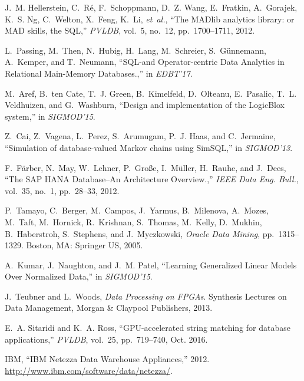 \documentclass[11pt,dvipdfm]{article}
\begin{document}
\begin{thebibliography}{10}
\itemsep=1pt 
\begin{small}

J.~M. Hellerstein, C.~R{\'e}, F.~Schoppmann, D.~Z. Wang, E.~Fratkin,
  A.~Gorajek, K.~S. Ng, C.~Welton, X.~Feng, K.~Li, {\em et~al.}, ``{The MADlib
  analytics library: or MAD skills, the SQL},'' {\em PVLDB}, vol.~5, no.~12,
  pp.~1700--1711, 2012.

L.~Passing, M.~Then, N.~Hubig, H.~Lang, M.~Schreier, S.~G{\"u}nnemann,
  A.~Kemper, and T.~Neumann, ``{SQL-and Operator-centric Data Analytics in
  Relational Main-Memory Databases.},'' in {\em EDBT'17}.

M.~Aref, B.~ten Cate, T.~J. Green, B.~Kimelfeld, D.~Olteanu, E.~Pasalic, T.~L.
  Veldhuizen, and G.~Washburn, ``{Design and implementation of the LogicBlox
  system},'' in {\em SIGMOD'15}.

Z.~Cai, Z.~Vagena, L.~Perez, S.~Arumugam, P.~J. Haas, and C.~Jermaine,
  ``{Simulation of database-valued Markov chains using SimSQL},'' in {\em
  SIGMOD'13}.

F.~F{\"a}rber, N.~May, W.~Lehner, P.~Gro{\ss}e, I.~M{\"u}ller, H.~Rauhe, and
  J.~Dees, ``{The SAP HANA Database--An Architecture Overview.},'' {\em IEEE
  Data Eng. Bull.}, vol.~35, no.~1, pp.~28--33, 2012.

P.~Tamayo, C.~Berger, M.~Campos, J.~Yarmus, B.~Milenova, A.~Mozes, M.~Taft,
  M.~Hornick, R.~Krishnan, S.~Thomas, M.~Kelly, D.~Mukhin, B.~Haberstroh,
  S.~Stephens, and J.~Myczkowski, {\em {Oracle Data Mining}}, pp.~1315--1329.
\newblock Boston, MA: Springer US, 2005.

A.~Kumar, J.~Naughton, and J.~M. Patel, ``{Learning Generalized Linear Models
  Over Normalized Data},'' in {\em SIGMOD'15}.

J.~Teubner and L.~Woods, {\em {Data Processing on FPGAs}}.
\newblock Synthesis Lectures on Data Management, Morgan {\&} Claypool
  Publishers, 2013.

E.~A. Sitaridi and K.~A. Ross, ``{{GPU}-accelerated string matching for
  database applications},'' {\em PVLDB}, vol.~25, pp.~719--740, Oct. 2016.

IBM, ``{{IBM Netezza} Data Warehouse Appliances},'' 2012.
\newblock \url{http://www.ibm.com/software/data/netezza/}.


\end{small}
\end{thebibliography}
\end{document}
